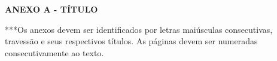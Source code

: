\textbf{\MakeUppercase{ANEXO A - TÍTULO}}
\vspace*{0.5cm}

***Os anexos devem ser identificados por letras maiúsculas consecutivas, travessão e seus respectivos títulos. As páginas devem ser numeradas consecutivamente ao texto.